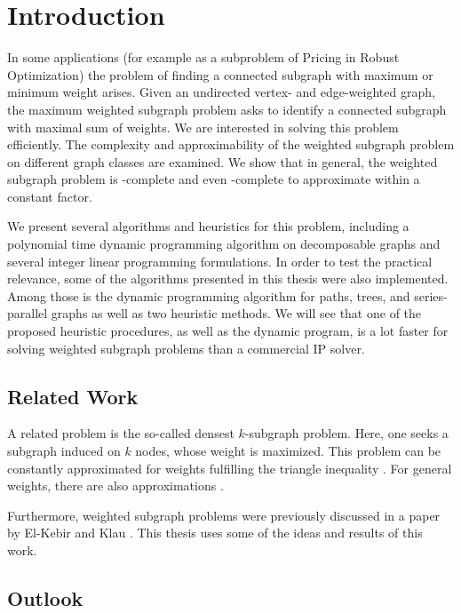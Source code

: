 \thispagestyle{empty}
\section*{Introduction}
\label{sec:intro}

In some applications (for example as a subproblem of Pricing in Robust Optimization) the problem of finding a connected subgraph with maximum or minimum weight arises. Given an undirected vertex- and edge-weighted graph, the maximum weighted subgraph problem asks to identify a connected subgraph with maximal sum of weights. We are interested in solving this problem efficiently. The complexity and approximability of the weighted subgraph problem on different graph classes are examined. We show that in general, the weighted subgraph problem is \NP-complete and even \NP-complete to approximate within a constant factor.\medskip

We present several algorithms and heuristics for this problem, including a polynomial time dynamic programming algorithm on decomposable graphs and several integer linear programming formulations. In order to test the practical relevance, some of the algorithms presented in this thesis were also implemented. Among those is the dynamic programming algorithm for paths, trees, and series-parallel graphs as well as two heuristic methods. We will see that one of the proposed heuristic procedures, as well as the dynamic program, is a lot faster for solving weighted subgraph problems than a commercial IP solver.


\subsection*{Related Work}
\label{sec:intro:related}

A related problem is the so-called densest $k$-subgraph problem. Here, one seeks a subgraph induced on $k$ nodes, whose weight is maximized. This problem can be constantly approximated for weights fulfilling the triangle inequality \cite{RRT94, Tam91}. For general weights, there are also approximations \cite{KP93}.\medskip

Furthermore, weighted subgraph problems were previously discussed in a paper by El-Kebir and Klau \cite{EK14}. This thesis uses some of the ideas and results of this work.

\subsection*{Outlook}
\label{sec:intro:outlook}

